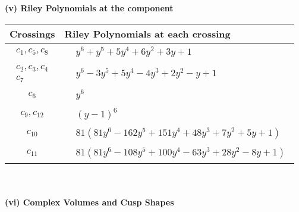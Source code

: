 \documentclass[1p]{elsarticle_modified}
\theoremstyle{definition}
\begin{document}
\newpage\renewcommand{\arraystretch}{1}
\flushleft \textbf{(v) Riley Polynomials at the component}\newline \\
\begin{tabular}{m{50pt}|m{274pt}}
Crossings & \hspace{64pt}Riley Polynomials at each crossing \\
\hline $$\begin{aligned}c_{1},c_{5},c_{8}\end{aligned}$$&$\begin{aligned}
&y^6+y^5+5 y^4+6 y^2+3 y+1
\end{aligned}$\\
\hline $$\begin{aligned}c_{2},c_{3},c_{4}\\c_{7}\end{aligned}$$&$\begin{aligned}
&y^6-3 y^5+5 y^4-4 y^3+2 y^2- y+1
\end{aligned}$\\
\hline $$\begin{aligned}c_{6}\end{aligned}$$&$\begin{aligned}
&y^6
\end{aligned}$\\
\hline $$\begin{aligned}c_{9},c_{12}\end{aligned}$$&$\begin{aligned}
&(y-1)^6
\end{aligned}$\\
\hline $$\begin{aligned}c_{10}\end{aligned}$$&$\begin{aligned}
&81(81 y^6-162 y^5+151 y^4+48 y^3+7 y^2+5 y+1)
\end{aligned}$\\
\hline $$\begin{aligned}c_{11}\end{aligned}$$&$\begin{aligned}
&81(81 y^6-108 y^5+100 y^4-63 y^3+28 y^2-8 y+1)
\end{aligned}$\\
\hline
\end{tabular}\\~\\
\newpage\flushleft \textbf{(vi) Complex Volumes and Cusp Shapes}
\end{document}
